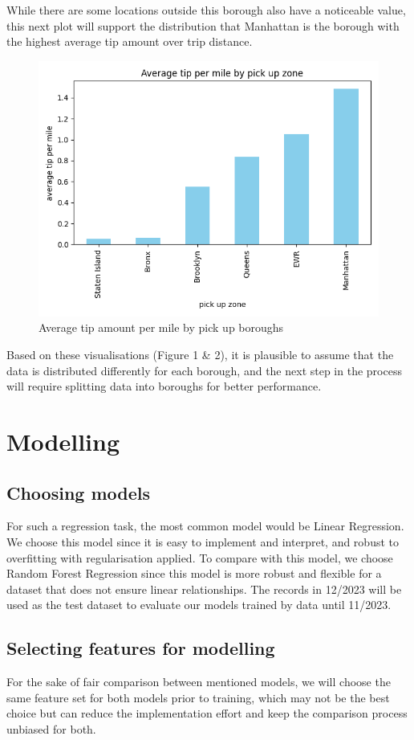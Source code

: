\documentclass[11pt]{article}
\begin{document}
While there are some locations outside this borough also have a noticeable value, this next plot will support the distribution that Manhattan is the borough with the highest average tip amount over trip distance.

\begin{figure}[h]
    \centering
    \includegraphics[width=0.5\linewidth]{plots/avg_tip_per_mile_by_zones.png}
    \caption{Average tip amount per mile by pick up boroughs}
\end{figure}

Based on these visualisations (Figure 1 \& 2), it is plausible to assume that the data is distributed differently for each borough, and the next step in the process will require splitting data into boroughs for better performance.

\section{Modelling}

\subsection{Choosing models}

For such a regression task, the most common model would be Linear Regression. We choose this model since it is easy to implement and interpret, and robust to overfitting with regularisation applied. To compare with this model, we choose Random Forest Regression since this model is more robust and flexible for a dataset that does not ensure linear relationships. The records in 12/2023 will be used as the test dataset to evaluate our models trained by data until 11/2023.

\subsection{Selecting features for modelling}

For the sake of fair comparison between mentioned models, we will choose the same feature set for both models prior to training, which may not be the best choice but can reduce the implementation effort and keep the comparison process unbiased for both.
\end{document}
